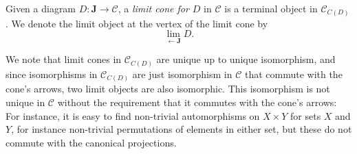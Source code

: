\documentclass[article, a4paper, 11pt, oneside]{memoir}
\numberwithin{equation}{chapter}
\newcommand{\cat}[1]{\mathcal{#1}}
\newcommand{\scat}[1]{\mathbf{#1}} %
\newcommand{\catC}{\cat{C}}
\newcommand{\scatJ}{\scat{J}}
\newcommand{\from}{\leftarrow}
\begin{document}
\begin{definition}
    Given a diagram $D \colon \scatJ \to \catC$, a \emph{limit cone for $D$} in $\catC$ is a terminal object in $\catC_{C(D)}$. We denote the limit object at the vertex of the limit cone by
    \begin{equation*}
        \lim_{\from \scatJ} D.
    \end{equation*}
\end{definition}
%
We note that limit cones in $\catC_{C(D)}$ are unique up to unique isomorphism, and since isomorphisms in $\catC_{C(D)}$ are just isomorphism in $\catC$ that commute with the cone's arrows, two limit objects are also isomorphic. This isomorphism is not unique in $\catC$ without the requirement that it commutes with the cone's arrows: For instance, it is easy to find non-trivial automorphisms on $X \times Y$ for sets $X$ and $Y$, for instance non-trivial permutations of elements in either set, but these do not commute with the canonical projections.
\end{document}

